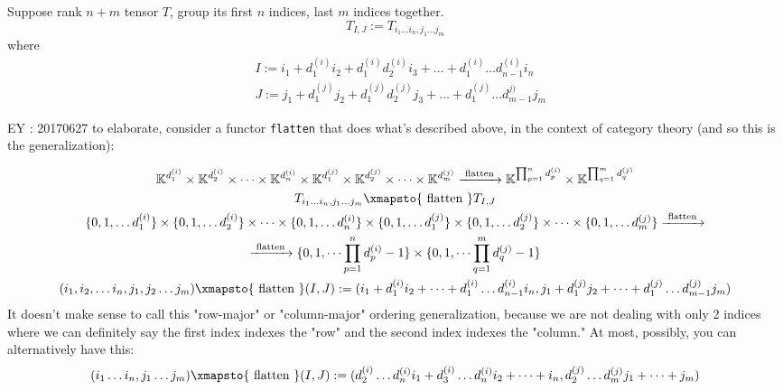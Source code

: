 \documentclass[10pt]{amsart}
\begin{document}
\begin{multicols*}{2}
Suppose rank $n+m$ tensor $T$, group its first $n$ indices, last $m$ indices together.
\[
T_{I,J} := T_{i_1\dots i_n,j_1\dots j_m}
\]
where 
\[
\begin{aligned}
	& I := i_1 + d_1^{(i)} i_2 + d_1^{(i)}  d_2^{(i)} i_3 + \dots + d_1^{(i)} \dots d_{n-1}^{(i)} i_n \\ 
	& J := j_1 + d_1^{(j)} j_2 + d_1^{(j)}  d_2^{(j)} j_3 + \dots + d_1^{(j)} \dots d_{m-1}^{j)} j_m 
\end{aligned}
\]

EY : 20170627 to elaborate, consider a functor \verb|flatten| that does what's described above, in the context of category theory (and so this is the generalization):

\begin{equation}
\begin{gathered}
	\mathbb{K}^{d_1^{(i)} } \times \mathbb{K}^{d_2^{(i)} } \times \dots \times \mathbb{K}^{d_n^{(i)} } \times \mathbb{K}^{d_1^{(j)} } \times \mathbb{K}^{d_2^{(j)} } \times \dots \times \mathbb{K}^{d_m^{(j)} } \xrightarrow{ \text{ flatten } } \mathbb{K}^{ \prod_{p=1}^n d_p^{(i)} } \times \mathbb{K}^{ \prod_{q=1}^m d_q^{(j)} }   \\
T_{i_1 \dots i_n, j_1 \dots j_m } \xmapsto{ \text{ flatten } } T_{I,J}   \\
\lbrace 0 ,1, \dots d_1^{(i)} \rbrace \times \lbrace 0 ,1, \dots d_2^{(i)} \rbrace \times \dots \times \lbrace 0 ,1, \dots d_n^{(i)} \rbrace \times \lbrace 0 ,1, \dots d_1^{(j)} \rbrace \times \lbrace 0 ,1, \dots d_2^{(j)} \rbrace \times \dots \times \lbrace 0 ,1, \dots d_m^{(j)} \rbrace \xrightarrow{ \text{ flatten } } \\
\xrightarrow{ \text{ flatten } }  \lbrace 0 ,1, \dots  \prod_{p=1}^n d_p^{(i)} -1 \rbrace \times \lbrace 0 ,1, \dots \prod_{q=1}^m d_q^{(j)} - 1 \rbrace  \\
(i_1,i_2, \dots i_n, j_1,j_2 \dots j_m ) \xmapsto{ \text{ flatten } } (I,J) := (i_1 + d_1^{(i)} i_2 + \dots + d_1^{(i)} \dots d_{n-1}^{(i)} i_n ,j_1 + d_1^{(j)} j_2 + \dots + d_1^{(j)} \dots d_{m-1}^{(j)} j_m ) \\ 
\end{gathered}
\end{equation}
It doesn't make sense to call this "row-major" or "column-major" ordering generalization, because we are not dealing with only 2 indices where we can definitely say the first index indexes the "row" and the second index indexes the "column."  At most, possibly, you can alternatively have this:
\[
(i_1 \dots i_n,j_1\dots j_m) \xmapsto{ \text{ flatten } } (I,J) := (d_2^{(i)} \dots d_n^{(i)}i_1 + d_3^{(i)} \dots d_n^{(i)} i_2 + \dots + i_n , d_2^{(j)} \dots d_m^{(j)} j_1 + \dots + j_m )
\]
\end{multicols*}
\end{document}
